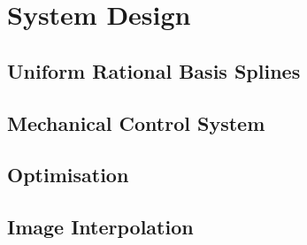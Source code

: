 \chapter{System Design}


\section{Uniform Rational Basis Splines}
\label{sec:design-urbs}
	
	
	

\section{Mechanical Control System}
\label{sec:design-control}
	

\section{Optimisation}
\label{sec:design-optimisation}
	
	
	
	
	


\section{Image Interpolation}
\label{sec:design-interpolation}
